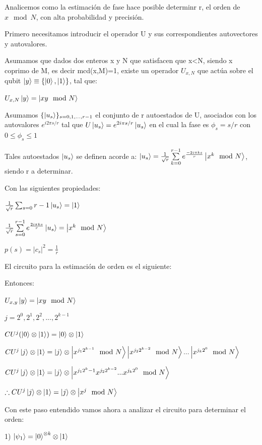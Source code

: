Analicemos como la estimación de fase hace posible determinr r, el orden de $x \mod N$, con alta probabilidad y precisión.

Primero necesitamos introducir el operador U y sus correspondientes autovectores y autovalores.

Asumamos que dados dos enteros x y N que satisfacen que x<N, siendo x coprimo de M, es decir mcd(x,M)=1, existe un operador $U_{x,N}$ que actúa sobre el qubit $\ket{y} \equiv \{\ket{0}, \ket{1}\}$, tal que:

$U_{x,N} \ket{y} = \ket{x y \mod N}$

Asumamos $\{ \ket{u_s}\}_{s = 0, 1, ..., r-1}$ el conjunto de r autoestados de U, asociados con los autovalores $e^{i 2 \pi s/r}$ tal que $U \ket{u_s} = e^{2 i \pi s /r} \ket{u_s}$ en el cual la fase es $\phi_s = s/r$ con $0 \leq \phi_s \leq 1$

Tales autoestados $\ket{u_s}$ se definen acorde a: $\ket{u_s} = \frac{1}{\sqrt{r}} \sum\limits_{k=0}^{r-1} e^{\frac{-2 i \pi k s}{r}} \ket{x^k \mod N}$, siendo r a determinar.

Con las siguientes propiedades:

$\frac{1}{\sqrt{r}} \sum_{s=0}{r-1} \ket{u_s} = \ket{1}$

$\frac{1}{\sqrt{r}} \sum\limits_{s=0}^{r-1} e^{\frac{2 i \pi k s}{r}} \ket{u_s} = \ket{x^k \mod N}$

$p(s) = |c_s|^2 = \frac{1}{r}$

El circuito para la estimación de orden es el siguiente:


Entonces:

$U_{x,y} \ket{y} = \ket{x y \mod N}$

$j = 2^0, 2^1, 2^2, ..., 2^{k-1}$

$CU^j (\ket{0} \otimes \ket{1}) = \ket{0} \otimes \ket{1}$

$CU^j \ket{j} \otimes \ket{1} = \ket{j} \otimes \ket{x^{j_1 2^{k-1}} \mod N} \ket{x^{j_2 2^{k-2}} \mod N} ... \ket{x^{j_k 2^0} \mod N}$

$CU^j \ket{j} \otimes \ket{1} = \ket{j} \otimes \ket{x^{j_1 2^k-1} x^{j_2 2^{k-2}} ... x^{j_k 2^0} \mod N}$

$\therefore CU^j \ket{j} \otimes \ket{1} = \ket{j} \otimes \ket{x^j \mod N}$

Con este paso entendido vamos ahora a analizar el circuito para determinar el orden:

1) $\ket{\psi_1} = \ket{0}^{\otimes k} \otimes \ket{1}$

